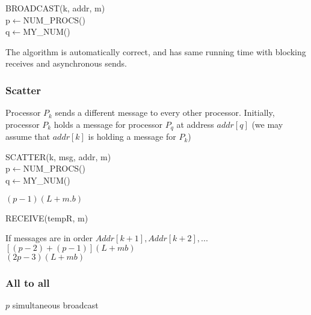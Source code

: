 \begin{algorithm}[H]
BROADCAST(k, addr, m)\\
p$\leftarrow$NUM\_PROCS()\\
q$\leftarrow$MY\_NUM()\\
\end{algorithm}

The algorithm is automatically correct, and has same running time with blocking receives and asynchronous sends.

\subsubsection{Scatter}

Processor $P_k$ sends a different message to every other processor. Initially, processor $P_k$ holds a message for processor $P_q$ at address $addr[q]$ (we may assume that $addr[k]$ is holding a message for $P_k$)


\begin{algorithm}[H]
SCATTER(k, msg, addr, m)\\
p$\leftarrow$NUM\_PROCS()\\
q$\leftarrow$MY\_NUM()\\
\end{algorithm}

 $(p-1)(L+m.b)$

\begin{algorithm}[H]
RECEIVE(tempR, m)\\
\end{algorithm}
If messages are in order $Addr[k+1],Addr[k+2],...$\\
$[(p-2)+(p-1)](L+mb)$\\
$(2p-3)(L+mb)$

\subsubsection{All to all}
$p$ simultaneous broadcast

